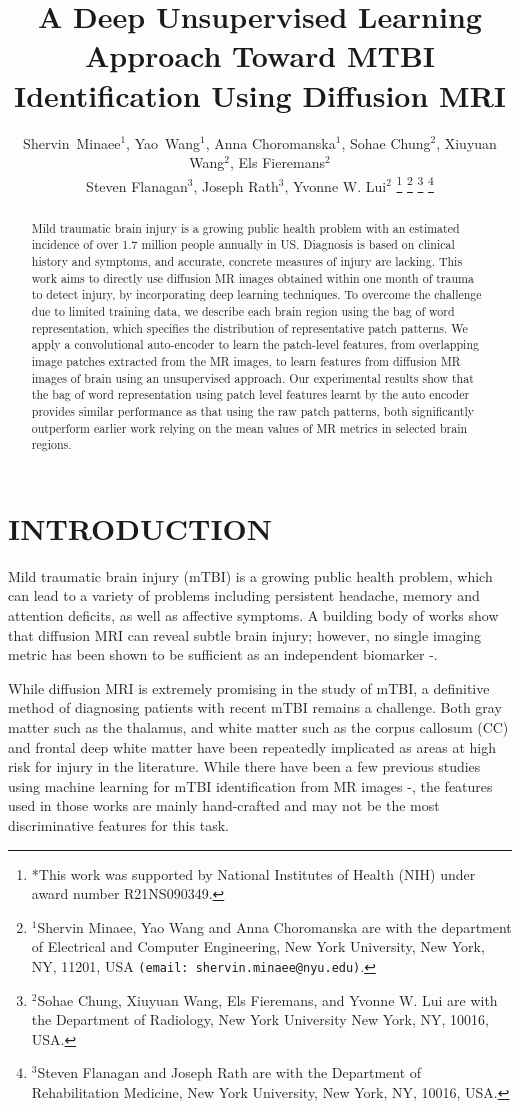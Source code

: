 \documentclass[letterpaper, 10 pt, conference]{ieeeconf}  %
\title{\LARGE \bf
A Deep Unsupervised Learning Approach Toward MTBI Identification Using Diffusion MRI}
\author{Shervin~Minaee$^{1}$,  Yao~Wang$^1$, Anna Choromanska$^1$, Sohae Chung$^2$, Xiuyuan Wang$^2$, Els Fieremans$^2$ \\
Steven Flanagan$^3$, Joseph Rath$^3$, Yvonne W. Lui$^2$%
\thanks{*This work was supported by  National Institutes of Health (NIH) under award number  R21NS090349.}%
\thanks{$^{1}$Shervin Minaee, Yao Wang and Anna Choromanska are with the department of Electrical and Computer Engineering, New York University, New York, NY, 11201, USA
        {\tt\small (email:\ shervin.minaee@nyu.edu)}.} %
\thanks{$^{2}$Sohae Chung, Xiuyuan Wang, Els Fieremans, and Yvonne W. Lui are with the Department of Radiology, New York University
        New York, NY, 10016, USA.
       }
\thanks{$^{3}$Steven Flanagan and Joseph Rath are with the Department of Rehabilitation Medicine, New York University, New York, NY, 10016, USA.
       }
}
\begin{document}
\maketitle
\thispagestyle{empty}
\pagestyle{empty}


\begin{abstract}
Mild traumatic brain injury is a growing public health problem with an estimated incidence of over 1.7 million people annually in US. 
Diagnosis is based on clinical history and symptoms, and accurate, concrete measures of injury are lacking.
This work aims to directly use diffusion MR images obtained within one month of trauma to detect injury, by incorporating deep learning techniques.
To overcome the challenge due to limited training data,  we describe each brain region using the bag of word representation, which specifies  the distribution of representative patch patterns. 
We apply a convolutional auto-encoder to learn  the patch-level features, from overlapping image patches extracted from the MR images,  to learn features from  diffusion MR images of brain using an unsupervised approach.
Our experimental results show that the bag of word representation using  patch level features learnt by the auto encoder provides similar performance as that using the raw patch patterns, both significantly outperform earlier work relying on the mean values of MR metrics in selected brain regions.
\end{abstract}


\section{INTRODUCTION}
Mild traumatic brain injury (mTBI) is a growing public health problem, which can lead to a variety of problems including persistent headache, memory and attention deficits, as well as affective symptoms.
A building body of works show that diffusion MRI can reveal subtle brain injury; however, no single imaging metric has been shown to be sufficient as an independent biomarker \cite{lui3}-\cite{lui5}.


While diffusion MRI is extremely promising in the study of mTBI, a definitive method of diagnosing patients with recent mTBI remains a challenge.
Both gray matter such as the thalamus, and white matter such as the corpus callosum (CC) and frontal deep white matter have been repeatedly implicated as areas at high risk for injury in the literature.
While there have been a few previous studies using machine learning for mTBI identification from MR images \cite{yuanyi}-\cite{minaee2},  the features used in those works are mainly hand-crafted and may  not be the most discriminative features for this task.
\end{document}
